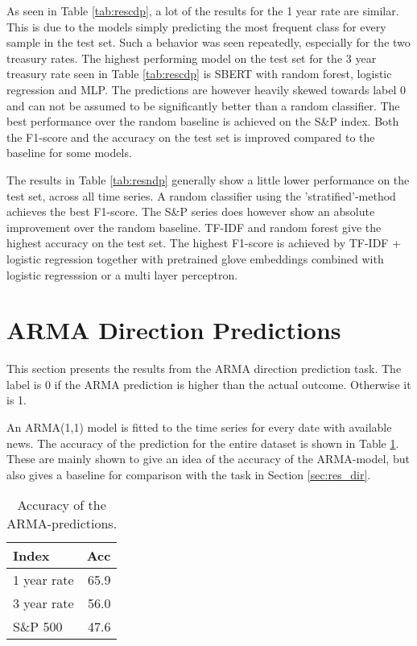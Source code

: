 As seen in Table \ref{tab:rescdp}, a lot of the results for the 1 year rate are similar. This is due to the models simply predicting the most frequent class for every sample in the test set. Such a behavior was seen repeatedly, especially for the two treasury rates. The highest performing model on the test set for the 3 year treasury rate seen in Table \ref{tab:rescdp} is SBERT with random forest, logistic regression and MLP. The predictions are however heavily skewed towards label 0 and can not be assumed to be significantly better than a random classifier.
The best performance over the random baseline is achieved on the S\&P index. Both the F1-score and the accuracy on the test set is improved compared to the baseline for some models. 

The results in Table \ref{tab:resndp} generally show a little lower performance on the test set, across all time series. A random classifier using the 'stratified'-method achieves the best F1-score. The S\&P series does however show an absolute improvement over the random baseline. TF-IDF and random forest give the highest accuracy on the test set. The highest F1-score is achieved by TF-IDF + logistic regression together with pretrained glove embeddings  combined with logistic regresssion or a multi layer perceptron. 

\section{ARMA Direction Predictions}\label{sec:res_arma}

This section presents the results from the ARMA direction prediction task. The label is 0 if the ARMA prediction is higher than the actual outcome. Otherwise it is 1. 

An ARMA(1,1) model is fitted to the time series for every date with available news. The accuracy of the prediction for the entire dataset is shown in Table \ref{tab:arma_acc}. These are mainly shown to give an idea of the accuracy of the ARMA-model, but also gives a baseline for comparison with the task in Section \ref{sec:res_dir}.

\begin{table}[h]
    \centering
    \begin{tabular}{lr}
         \textbf{Index} &  \textbf{Acc}\\
         \hline \hline 
         1 year rate & 65.9 \\
         3 year rate & 56.0 \\
         S\&P 500 & 47.6 \\
         \hline 
    \end{tabular}
    \caption{Accuracy of the ARMA-predictions. }
    \label{tab:arma_acc}
\end{table}

